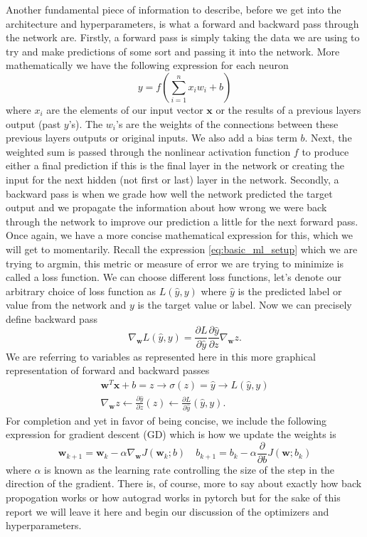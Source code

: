 \documentclass[10pt]{amsart}
\begin{document}
Another fundamental piece of information to describe, before we get into the architecture and hyperparameters, is what a forward and backward pass through the network are.
Firstly, a forward pass is simply taking the data we are using to try and make predictions of some sort and passing it into the network.
More mathematically we have the following expression for each neuron
\begin{equation}
y = f\left( \sum_{i=1}^n x_i w_i + b \right)
\label{eq:neuron_calc}
\end{equation}
where $x_i$ are the elements of our input vector $\bm x$  or the results of a previous layers output (past $y$'s).
The $w_i$'s are the weights of the connections between these previous layers outputs or original inputs.
We also add a bias term $b$.
Next, the weighted sum is passed through the nonlinear activation function $f$ to produce either a final prediction if this is the final layer in the network or creating the input for the next hidden (not first or last) layer in the network.
Secondly, a backward pass is when we grade how well the network predicted the target output and we propagate the information about how wrong we were back through the network to improve our prediction a little for the next forward pass.
Once again, we have a more concise mathematical expression for this, which we will get to momentarily.
Recall the expression \eqref{eq:basic_ml_setup} which we are trying to argmin, this metric or measure of error we are trying to minimize is called a loss function.
We can choose different loss functions, let's denote our arbitrary choice of loss function as $L(\hat y, y)$ where $\hat y$ is the predicted label or value from the network and $y$ is the target value or label.
Now we can precisely define backward pass
\begin{equation}
\nabla_{\bm w} L(\hat y, y) = \frac {\partial L}{\partial \hat y} \frac {\partial \hat y}{\partial z} \nabla_{\bm w} z.
\label{eq:back_prop}
\end{equation}
We are referring to variables as represented here in this more graphical representation of forward and backward passes
\begin{align*}
\boxed{\bm w^T \bm x + b = z} \rightarrow \boxed{\sigma(z) = \hat y} \rightarrow \boxed{L(\hat y , y)} \\
\boxed{\nabla_{\bm w} z} \leftarrow \boxed{\frac {\partial \hat y}{\partial z} (z)} \leftarrow \boxed{\frac {\partial L}{\partial \hat y}(\hat y , y)}.
\end{align*}
For completion and yet in favor of being concise, we include the following expression for gradient descent (GD) which is how we update the weights is
\begin{equation}
\bm w_{k + 1} = \bm w_{k} - \alpha \nabla_{\bm w} J(\bm w_{k}; b) \quad
b_{k + 1} = b_{k} - \alpha \frac \partial {\partial b}J(\bm w; b_k)
\label{eq:gd}
\end{equation}
where $\alpha$ is known as the learning rate controlling the size of the step in the direction of the gradient.
There is, of course, more to say about exactly how back propogation works or how autograd works in pytorch but for the sake of this report we will leave it here and begin our discussion of the optimizers and hyperparameters.
\end{document}
